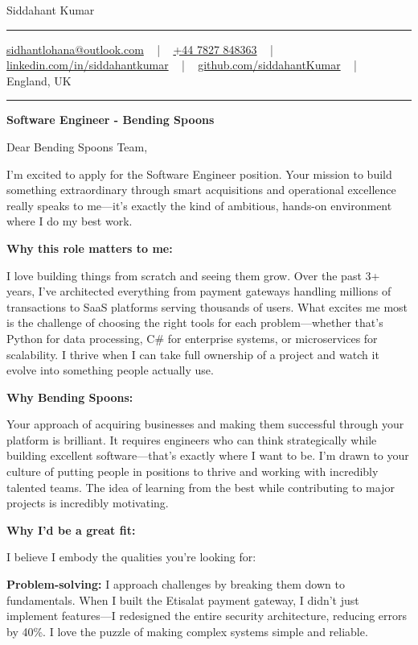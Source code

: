 \documentclass[letterpaper,10pt]{article}
\newcommand{\documentTitle}[2]{
  \begin{center}
    \vspace*{-0.3in}
    {\Huge\color{accentTitle} #1}
    \vspace{8pt}
    {\color{accentLine} \hrule}
    \vspace{2pt}
    \footnotesize{#2}
    \vspace{2pt}
    {\color{accentLine} \hrule}
  \end{center}
}
\begin{document}
\documentTitle{Siddahant Kumar}{
\vspace{0.1cm}
\href{mailto:sidhantlohana@outlook.com}{sidhantlohana@outlook.com} ~ | ~
\href{tel:+447827848363}{+44 7827 848363} ~ | ~
\href{https://www.linkedin.com/in/siddahantkumar/}{linkedin.com/in/siddahantkumar} ~ | ~
\href{https://github.com/siddahantKumar}{github.com/siddahantKumar} ~ | ~
England, UK
}

\begin{center}
\textbf{Software Engineer - Bending Spoons}
\end{center}

\vspace{10pt}

Dear Bending Spoons Team,

I'm excited to apply for the Software Engineer position. Your mission to build something extraordinary through smart acquisitions and operational excellence really speaks to me—it's exactly the kind of ambitious, hands-on environment where I do my best work.

\textbf{Why this role matters to me:}

I love building things from scratch and seeing them grow. Over the past 3+ years, I've architected everything from payment gateways handling millions of transactions to SaaS platforms serving thousands of users. What excites me most is the challenge of choosing the right tools for each problem—whether that's Python for data processing, C\# for enterprise systems, or microservices for scalability. I thrive when I can take full ownership of a project and watch it evolve into something people actually use.

\textbf{Why Bending Spoons:}

Your approach of acquiring businesses and making them successful through your platform is brilliant. It requires engineers who can think strategically while building excellent software—that's exactly where I want to be. I'm drawn to your culture of putting people in positions to thrive and working with incredibly talented teams. The idea of learning from the best while contributing to major projects is incredibly motivating.

\textbf{Why I'd be a great fit:}

I believe I embody the qualities you're looking for:

\textbf{Problem-solving:} I approach challenges by breaking them down to fundamentals. When I built the Etisalat payment gateway, I didn't just implement features—I redesigned the entire security architecture, reducing errors by 40\%. I love the puzzle of making complex systems simple and reliable.
\end{document}
